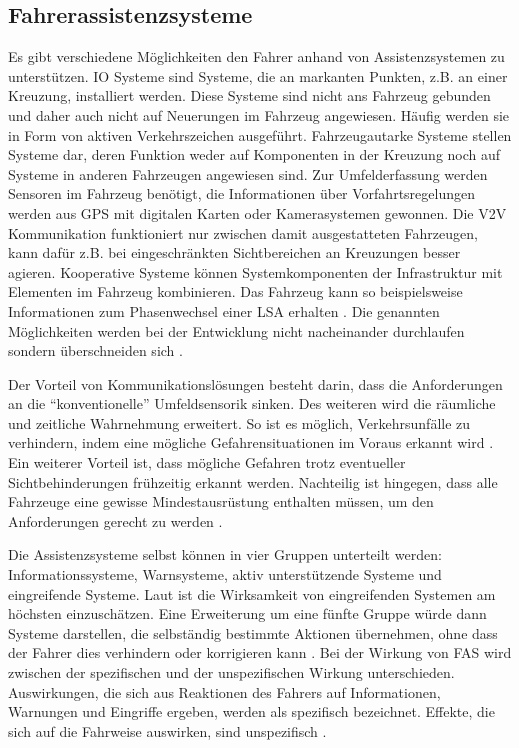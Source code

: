 \subsection{Fahrerassistenzsysteme}
Es gibt verschiedene Möglichkeiten den Fahrer anhand von Assistenzsystemen zu unterstützen. \ac{IO} Systeme sind Systeme, die an markanten Punkten, z.B. an einer Kreuzung, installiert werden. Diese Systeme sind nicht ans Fahrzeug gebunden und daher auch nicht auf Neuerungen im  Fahrzeug angewiesen. Häufig werden sie in Form von aktiven Verkehrszeichen ausgeführt. Fahrzeugautarke Systeme stellen Systeme dar, deren Funktion weder auf Komponenten in der Kreuzung noch auf Systeme in anderen Fahrzeugen angewiesen sind. Zur Umfelderfassung werden Sensoren im Fahrzeug benötigt, die Informationen über Vorfahrtsregelungen werden aus GPS mit digitalen Karten oder Kamerasystemen gewonnen. Die \ac{V2V} Kommunikation funktioniert nur zwischen damit ausgestatteten Fahrzeugen, kann dafür z.B. bei eingeschränkten Sichtbereichen an Kreuzungen besser agieren. Kooperative Systeme können Systemkomponenten der Infrastruktur mit Elementen im Fahrzeug kombinieren. Das Fahrzeug kann so beispielsweise Informationen zum Phasenwechsel einer LSA erhalten \parencite[S. 23-26]{Mages.2008}. Die genannten Möglichkeiten werden bei der Entwicklung nicht nacheinander durchlaufen sondern überschneiden sich \parencite[S. 88]{WissenschaflicherBeiratbeimBundesministerfurVerkehrBauundStadtentwicklung.2011}.

Der Vorteil von Kommunikationslösungen besteht darin, dass die Anforderungen an die \enquote{konventionelle} Umfeldsensorik sinken. Des weiteren wird die räumliche und zeitliche Wahrnehmung erweitert. So ist es möglich, Verkehrsunfälle zu verhindern, indem eine mögliche Gefahrensituationen im Voraus erkannt wird \parencite[S. 59]{Gerstenberger.17.02.2015}. Ein weiterer Vorteil ist, dass mögliche Gefahren trotz eventueller Sichtbehinderungen frühzeitig erkannt werden. Nachteilig ist hingegen, dass alle Fahrzeuge eine gewisse Mindestausrüstung enthalten müssen, um den Anforderungen gerecht zu werden \parencite[S. 2]{Mages.2008}.

Die Assistenzsysteme selbst können in vier Gruppen unterteilt werden: Informationssysteme, Warnsysteme, aktiv unterstützende Systeme und eingreifende Systeme. Laut \Textcite[S. 11]{Meitinger.2008} ist die Wirksamkeit von eingreifenden Systemen am höchsten einzuschätzen. Eine Erweiterung um eine fünfte Gruppe würde dann Systeme darstellen, die selbständig bestimmte Aktionen übernehmen, ohne dass der Fahrer dies verhindern oder korrigieren kann \parencite[S. 13]{Vollrath.2006}. Bei der Wirkung von FAS wird zwischen der spezifischen und der unspezifischen Wirkung unterschieden. Auswirkungen, die sich aus Reaktionen des Fahrers auf Informationen, Warnungen und Eingriffe ergeben, werden als spezifisch bezeichnet. Effekte, die sich auf die Fahrweise auswirken, sind unspezifisch \parencite[S. 50f]{Grundl.2005}.

